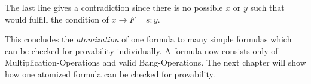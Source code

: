 The last line gives a contradiction since there is no possible $x$ or $y$ such that would fulfill the condition of $x \rightarrow F = s:y$.



\par
This concludes the \emph{atomization} of one formula to many simple formulas which can be checked for provability individually. A formula now consists only of Multiplication-Operations and valid Bang-Operations. The next chapter will show how one atomized formula can be checked for provability.

